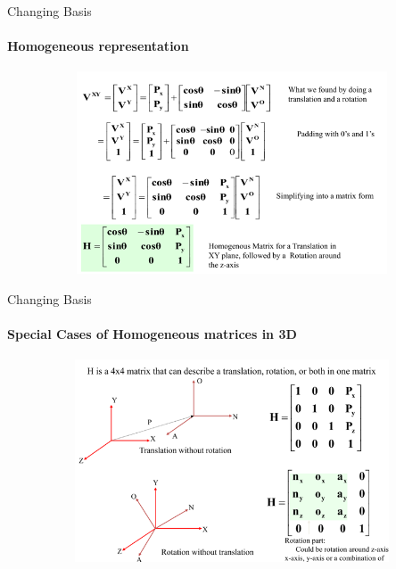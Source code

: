 \documentclass[aspectratio=169,notes]{beamer}
\begin{document}
\begin{frame}[t]{Changing Basis}
    \framesubtitle{Homogeneous representation}
    \vspace{-0.6cm}
    \begin{figure}[H]
        \centering\includegraphics[height=6cm,width=1\textwidth,keepaspectratio]{change_klimchik_2.png}
        \label{fig:change_klimchik_2.png}
    \end{figure}
\end{frame}

\begin{frame}[t]{Changing Basis}
    \framesubtitle{Special Cases of Homogeneous matrices in 3D}
    \vspace{-0.6cm}
    \begin{figure}[H]
        \centering\includegraphics[height=6cm,width=1\textwidth,keepaspectratio]{change_klimchik_3.png}
        \label{fig:change_klimchik_3.png}
    \end{figure}
\end{frame}
\end{document}
